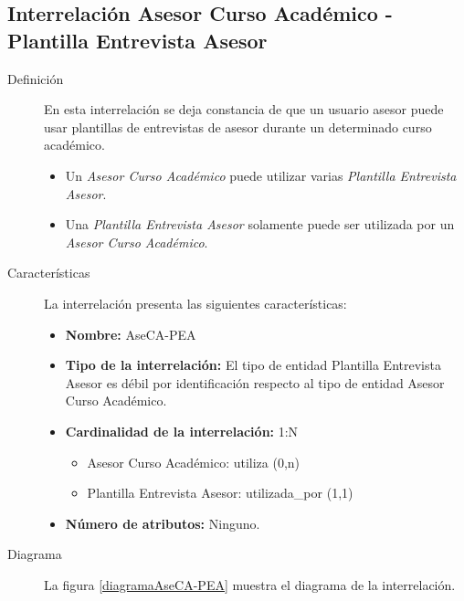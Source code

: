 \subsection{Interrelación Asesor Curso Académico - Plantilla Entrevista Asesor}

   \begin{description}
      \item[Definición] En esta interrelación se deja constancia de que un
      usuario asesor puede usar plantillas de entrevistas de asesor durante un
      determinado curso académico.

      \begin{itemize}
       \item Un \textit{Asesor Curso Académico} puede utilizar varias
             \textit{Plantilla Entrevista Asesor}.
       \item Una \textit{Plantilla Entrevista Asesor} solamente puede ser
             utilizada por un \textit{Asesor Curso Académico}.
      \end{itemize}

      \item[Características] La interrelación presenta las siguientes
                             características:

         \begin{itemize}
            \item \textbf{Nombre:} AseCA-PEA
            \item \textbf{Tipo de la interrelación:} El tipo de entidad
            Plantilla Entrevista Asesor es débil por identificación respecto al
            tipo de entidad Asesor Curso Académico.
            \item \textbf{Cardinalidad de la interrelación:} 1:N
                  \begin{itemize}
                     \item Asesor Curso Académico: utiliza (0,n)
                     \item Plantilla Entrevista Asesor: utilizada\_por (1,1)
                  \end{itemize}
            \item \textbf{Número de atributos:} Ninguno.
         \end{itemize}

      \item[Diagrama] La figura \ref{diagramaAseCA-PEA} muestra el diagrama de
      la interrelación.


\end{description}
